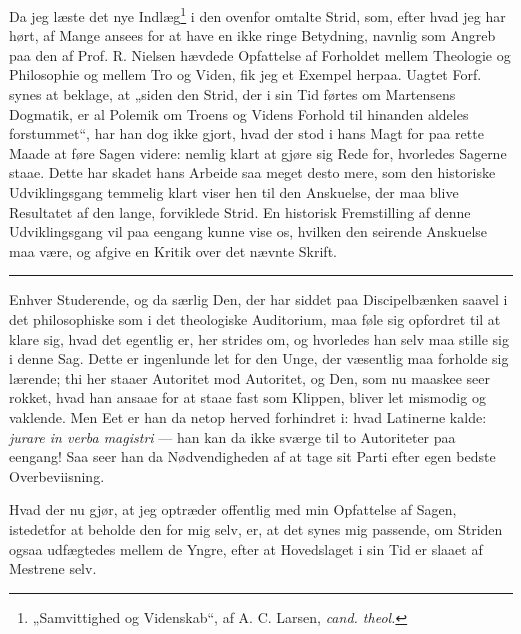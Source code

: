 \documentclass[12pt,a4paper]{book}
\newcommand{\opage}[1]{\marginnote{\footnotesize\textit{[#1]}}}
\begin{document}
\opage{4}\setcounter{footnote}{0}%
Da jeg læste det nye Indlæg\footnote{„Samvittighed og Videnskab“, af A. C. Larsen, \textit{cand. theol.}} i den ovenfor omtalte
Strid, som, efter hvad jeg har hørt, af Mange ansees for at
have en ikke ringe Betydning, navnlig som Angreb paa den
af Prof. R. Nielsen hævdede Opfattelse af Forholdet mellem
Theologie og Philosophie og mellem Tro og Viden, fik jeg et
Exempel herpaa. Uagtet Forf. synes at beklage, at „siden den
Strid, der i sin Tid førtes om Martensens Dogmatik, er al
Polemik om Troens og Videns Forhold til hinanden aldeles
forstummet“, har han dog ikke gjort, hvad der stod i hans
Magt for paa rette Maade at føre Sagen videre: nemlig
klart at gjøre sig Rede for, hvorledes Sagerne staae. Dette
har skadet hans Arbeide saa meget desto mere, som den historiske
Udviklingsgang temmelig klart viser hen til den Anskuelse, der
maa blive Resultatet af den lange, forviklede Strid. En historisk
Fremstilling af denne Udviklingsgang vil paa eengang
kunne vise os, hvilken den seirende Anskuelse maa være, og
afgive en Kritik over det nævnte Skrift.

\begin{center}\rule{4em}{0.4pt}\end{center}

Enhver Studerende, og da særlig Den, der har siddet
paa Discipelbænken saavel i det philosophiske som i det theologiske
Auditorium, maa føle sig opfordret til at klare sig,
hvad det egentlig er, her strides om, og hvorledes han selv
maa stille sig i denne Sag. Dette er ingenlunde let for den
Unge, der væsentlig maa forholde sig lærende; thi her staaer
Autoritet mod Autoritet, og Den, som nu maaskee seer rokket,
hvad han ansaae for at staae fast som Klippen, bliver let
mismodig og vaklende. Men Eet er han da netop herved
forhindret i: hvad Latinerne kalde: \textit{jurare in verba magistri} ---
han kan da ikke sværge til to Autoriteter paa eengang! Saa
seer han da Nødvendigheden af at tage sit Parti efter egen
bedste Overbeviisning.

\opage{5}\setcounter{footnote}{0}%
Hvad der nu gjør, at jeg optræder offentlig med min
Opfattelse af Sagen, istedetfor at beholde den for mig selv,
er, at det synes mig passende, om Striden ogsaa udfægtedes
mellem de Yngre, efter at Hovedslaget i sin Tid er slaaet af
Mestrene selv.
\end{document}
